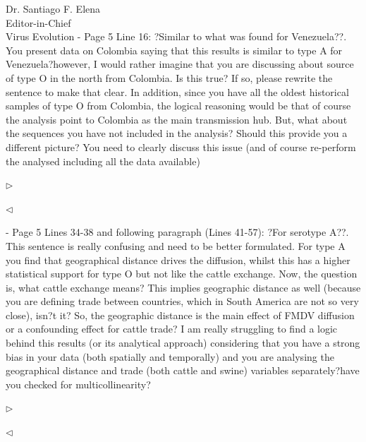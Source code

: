 \documentclass[ucla,biomath,12pt,noaddrfooter,datefrom]{UC_letter}
\newenvironment{reply}{$\triangleright$\bf}{$\triangleleft$}
\begin{document}
\begin{letter}{
Dr. Santiago F. Elena \\
Editor-in-Chief \\
Virus Evolution
}
-       Page 5 Line 16: ?Similar to what was found for Venezuela??. 
You present data on Colombia saying that this results is similar to type A for Venezuela?however, I would rather imagine that you are discussing about source of type O in the north from Colombia. 
Is this true? If so, please rewrite the sentence to make that clear. 
In addition, since you have all the oldest historical samples of type O from Colombia, the logical reasoning would be that of course the analysis point to Colombia as the main transmission hub. 
But, what about the sequences you have not included in the analysis? 
Should this provide you a different picture? 
You need to clearly discuss this issue (and of course re-perform the analysed including all the data available)

\begin{reply}

\end{reply}

-       Page 5 Lines 34-38 and following paragraph (Lines 41-57): ?For serotype A??. 
This sentence is really confusing and need to be better formulated. 
For type A you find that geographical distance drives the diffusion, whilst this has a higher statistical support for type O but not like the cattle exchange. 
Now, the question is, what cattle exchange means? 
This implies geographic distance as well (because you are defining trade between countries, which in South America are not so very close), isn?t it? 
So, the geographic distance is the main effect of FMDV diffusion or a confounding effect for cattle trade? 
I am really struggling to find a logic behind this results (or its analytical approach) considering that you have a strong bias in your data (both spatially and temporally) and you are analysing the geographical distance and trade (both cattle and swine) variables separately?have you checked for multicollinearity?

\begin{reply}

\end{reply}


\end{letter}
\end{document}
